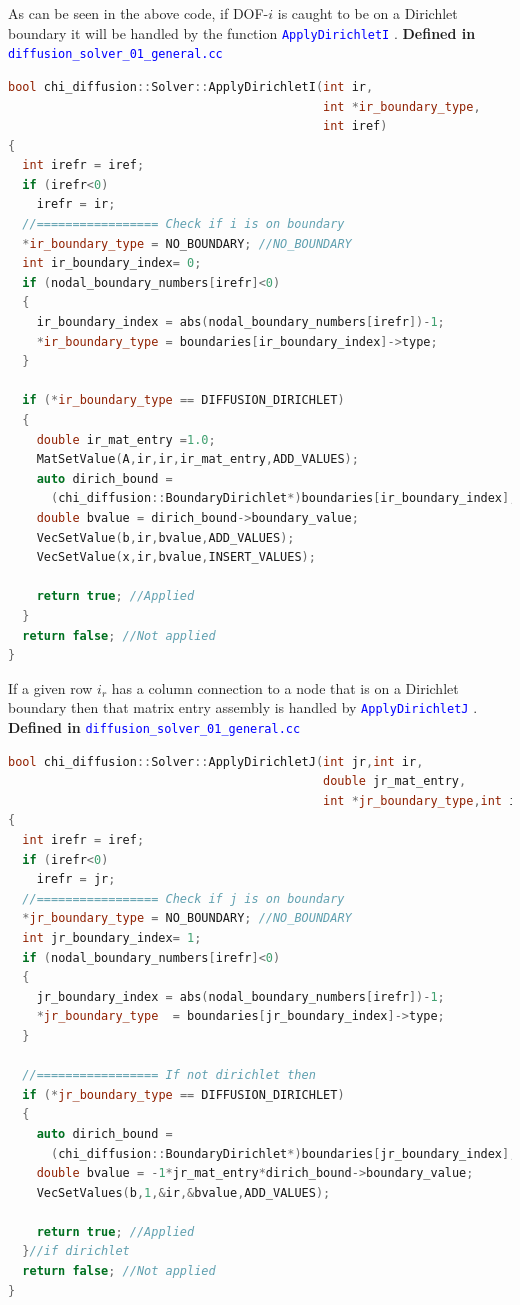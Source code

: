 \documentclass[11pt,letterpaper,titlepage]{article}
\newcommand{\xmltag}[1]{\textcolor{blue}{ \texttt{#1}} }
\numberwithin{equation}{section}
\begin{document}
As can be seen in the above code, if DOF-$i$ is caught to be on a Dirichlet boundary it will be handled by the function \xmltag{ApplyDirichletI}.
\newline
\newline
\textbf{Defined in }\xmltag{diffusion\_solver\_01\_general.cc}
\begin{lstlisting}[language=c++]
bool chi_diffusion::Solver::ApplyDirichletI(int ir,
                                            int *ir_boundary_type,
                                            int iref)
{
  int irefr = iref;
  if (irefr<0)
    irefr = ir;
  //================= Check if i is on boundary
  *ir_boundary_type = NO_BOUNDARY; //NO_BOUNDARY
  int ir_boundary_index= 0;
  if (nodal_boundary_numbers[irefr]<0)
  {
    ir_boundary_index = abs(nodal_boundary_numbers[irefr])-1;
    *ir_boundary_type = boundaries[ir_boundary_index]->type;
  }

  if (*ir_boundary_type == DIFFUSION_DIRICHLET)
  {
    double ir_mat_entry =1.0;
    MatSetValue(A,ir,ir,ir_mat_entry,ADD_VALUES);
    auto dirich_bound =
      (chi_diffusion::BoundaryDirichlet*)boundaries[ir_boundary_index];
    double bvalue = dirich_bound->boundary_value;
    VecSetValue(b,ir,bvalue,ADD_VALUES);
    VecSetValue(x,ir,bvalue,INSERT_VALUES);

    return true; //Applied
  }
  return false; //Not applied
}
\end{lstlisting}

If a given row $i_r$ has a column connection to a node that is on a Dirichlet boundary then that matrix entry assembly is handled by \xmltag{ApplyDirichletJ}.
\newline
\newline
\textbf{Defined in }\xmltag{diffusion\_solver\_01\_general.cc}
\begin{lstlisting}[language=c++]
bool chi_diffusion::Solver::ApplyDirichletJ(int jr,int ir,
                                            double jr_mat_entry,
                                            int *jr_boundary_type,int iref)
{
  int irefr = iref;
  if (irefr<0)
    irefr = jr;
  //================= Check if j is on boundary
  *jr_boundary_type = NO_BOUNDARY; //NO_BOUNDARY
  int jr_boundary_index= 1;
  if (nodal_boundary_numbers[irefr]<0)
  {
    jr_boundary_index = abs(nodal_boundary_numbers[irefr])-1;
    *jr_boundary_type  = boundaries[jr_boundary_index]->type;
  }

  //================= If not dirichlet then
  if (*jr_boundary_type == DIFFUSION_DIRICHLET)
  {
    auto dirich_bound =
      (chi_diffusion::BoundaryDirichlet*)boundaries[jr_boundary_index];
    double bvalue = -1*jr_mat_entry*dirich_bound->boundary_value;
    VecSetValues(b,1,&ir,&bvalue,ADD_VALUES);

    return true; //Applied
  }//if dirichlet
  return false; //Not applied
}
\end{lstlisting}
\end{document}

